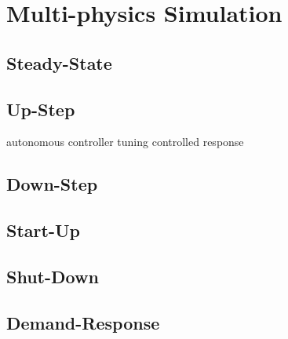 \section{Multi-physics Simulation}

\subsection{Steady-State}

\subsection{Up-Step}
autonomous
controller tuning
controlled response


\subsection{Down-Step}

\subsection{Start-Up}

\subsection{Shut-Down}

\subsection{Demand-Response}
